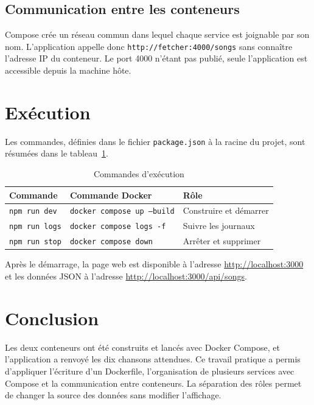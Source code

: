 \documentclass[11pt,a4paper]{article}
\begin{document}
\subsection{Communication entre les conteneurs}
Compose crée un réseau commun dans lequel chaque service est joignable par son nom.
L'application appelle donc \texttt{http://fetcher:4000/songs} sans connaître
l'adresse IP du conteneur. Le port 4000 n'étant pas publié, seule l'application est
accessible depuis la machine hôte.

\section{Exécution}
Les commandes, définies dans le fichier \texttt{package.json} à la racine du projet,
sont résumées dans le tableau~\ref{tab:commandes}.

\begin{table}[H]
\centering
\begin{tabular}{lll}
\toprule
\textbf{Commande} & \textbf{Commande Docker} & \textbf{Rôle} \\
\midrule
\texttt{npm run dev}  & \texttt{docker compose up --build} & Construire et démarrer \\
\texttt{npm run logs} & \texttt{docker compose logs -f}    & Suivre les journaux \\
\texttt{npm run stop} & \texttt{docker compose down}       & Arrêter et supprimer \\
\bottomrule
\end{tabular}
\caption{Commandes d'exécution}
\label{tab:commandes}
\end{table}

Après le démarrage, la page web est disponible à l'adresse
\url{http://localhost:3000} et les données JSON à l'adresse
\url{http://localhost:3000/api/songs}.

\section{Conclusion}
Les deux conteneurs ont été construits et lancés avec Docker Compose, et
l'application a renvoyé les dix chansons attendues. Ce travail pratique a permis
d'appliquer l'écriture d'un Dockerfile, l'organisation de plusieurs services avec
Compose et la communication entre conteneurs. La séparation des rôles permet de
changer la source des données sans modifier l'affichage.
\end{document}
